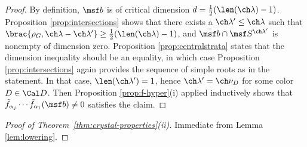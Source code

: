 \documentclass[final]{amsart}
\theoremstyle{remark}
\theoremstyle{definition}
\numberwithin{equation}{section}
\begin{document}
\begin{proof}
By definition, $\msf b$ is of critical dimension $d= \frac{1}{2}(\len(\ch\lambda)-1)$.
Proposition \ref{prop:intersections} shows that there exists
a $\ch\lambda' \le \ch\lambda$ 
such that $\brac{\rho_G, \ch\lambda-\ch\lambda'} \ge \frac 1 2(\len(\ch\lambda)-1)$, and $\bar{\msf b} \cap \msf S^{\ch\lambda'}$ is nonempty of dimension zero. Proposition \ref{prop:centralstrata} states that the dimension inequality should be an equality, in which case Proposition \ref{prop:intersections} again provides the sequence of simple roots as in the statement. In that case, $\len(\ch\lambda')=1$, hence $\ch\lambda' = \ch\nu_D$ for some color $D\in \Cal D$. 
Then Proposition \ref{prop:f-hyper}(i) applied inductively shows that
$\tilde f_{\alpha_j} \dotsb \tilde f_{\alpha_1}(\msf b) \ne 0$
satisfies the claim.
\end{proof}


\begin{proof}[Proof of Theorem~\ref{thm:crystal-properties}(ii)]
Immediate from Lemma \ref{lem:lowering}.
\end{proof}
\end{document}
